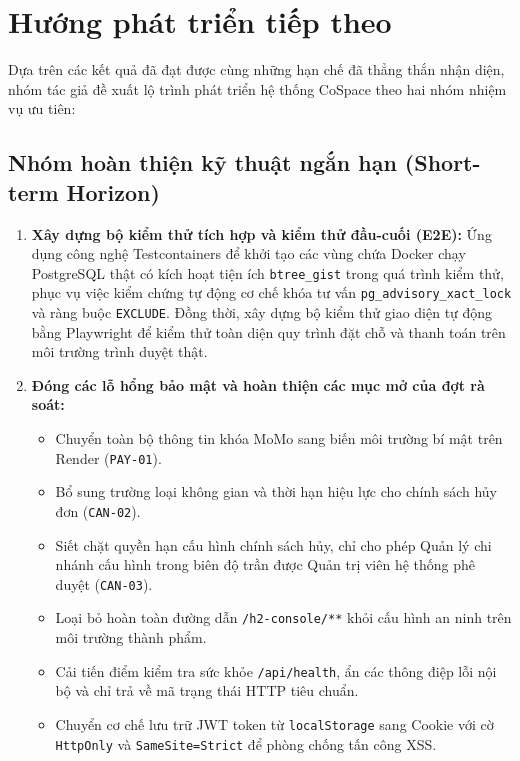 \section{Hướng phát triển tiếp theo}
\label{sec:kl_huongphattrien}

Dựa trên các kết quả đã đạt được cùng những hạn chế đã thẳng thắn nhận diện, nhóm tác giả đề xuất lộ trình phát triển hệ thống CoSpace theo hai nhóm nhiệm vụ ưu tiên:

\subsection{Nhóm hoàn thiện kỹ thuật ngắn hạn (Short-term Horizon)}
\begin{enumerate}
    \item \textbf{Xây dựng bộ kiểm thử tích hợp và kiểm thử đầu-cuối (E2E):} Ứng dụng công nghệ Testcontainers để khởi tạo các vùng chứa Docker chạy PostgreSQL thật có kích hoạt tiện ích \texttt{btree\_gist} trong quá trình kiểm thử, phục vụ việc kiểm chứng tự động cơ chế khóa tư vấn \texttt{pg\_advisory\_xact\_lock} và ràng buộc \texttt{EXCLUDE}. Đồng thời, xây dựng bộ kiểm thử giao diện tự động bằng Playwright để kiểm thử toàn diện quy trình đặt chỗ và thanh toán trên môi trường trình duyệt thật.
    
    \item \textbf{Đóng các lỗ hổng bảo mật và hoàn thiện các mục mở của đợt rà soát:} 
    \begin{itemize}
        \item Chuyển toàn bộ thông tin khóa MoMo sang biến môi trường bí mật trên Render (\texttt{PAY-01}).
        \item Bổ sung trường loại không gian và thời hạn hiệu lực cho chính sách hủy đơn (\texttt{CAN-02}).
        \item Siết chặt quyền hạn cấu hình chính sách hủy, chỉ cho phép Quản lý chi nhánh cấu hình trong biên độ trần được Quản trị viên hệ thống phê duyệt (\texttt{CAN-03}).
        \item Loại bỏ hoàn toàn đường dẫn \texttt{/h2-console/**} khỏi cấu hình an ninh trên môi trường thành phẩm.
        \item Cải tiến điểm kiểm tra sức khỏe \texttt{/api/health}, ẩn các thông điệp lỗi nội bộ và chỉ trả về mã trạng thái HTTP tiêu chuẩn.
        \item Chuyển cơ chế lưu trữ JWT token từ \texttt{localStorage} sang Cookie với cờ \texttt{HttpOnly} và \texttt{SameSite=Strict} để phòng chống tấn công XSS.
    \end{itemize}
    

\end{enumerate}

